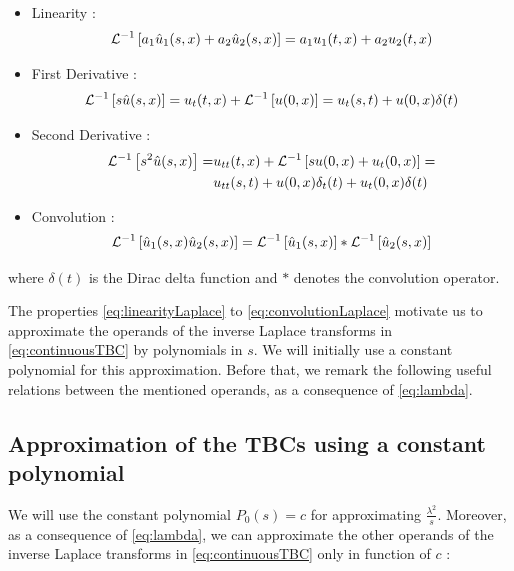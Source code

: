 \begin{itemize}
	\item Linearity :
		\begin{equation}
			\label{eq:linearityLaplace}
				\mathcal{L}^{-1} \left[a_1\hat{u}_1(s,x) + a_2\hat{u}_2(s,x)\right] = a_1u_1(t,x) + a_2u_2(t,x)
		\end{equation}
	\item First Derivative : 
		\begin{equation}
			\label{eq:firstDerivativeLaplace}
			\mathcal{L}^{-1} \left[ s\hat{u}(s,x) \right] = u_t(t,x) + \mathcal{L}^{-1} \left[ u(0,x) \right] =  u_t(s,t) +  u(0,x) \delta (t)
		\end{equation}
	\item Second Derivative : 
		\begin{equation}
			\label{eq:secondDerivativeLaplace}
			\begin{aligned}
			\mathcal{L}^{-1} \left[ s^2\hat{u}(s,x) \right] = & u_{tt}(t,x) + \mathcal{L}^{-1} \left[ su(0,x) + u_{t}(0,x)\right] = \\
																		   & u_{tt}(s,t) + u(0,x)\delta_t(t) +  u_t(0,x)\delta (t)
			\end{aligned}
		\end{equation}
	\item Convolution :
	\begin{equation}
		\label{eq:convolutionLaplace}
		\mathcal{L}^{-1} \left[ \hat{u}_1(s,x)\hat{u}_2(s,x)\right] = \mathcal{L}^{-1} \left[ \hat{u}_1(s,x)\right] * \mathcal{L}^{-1} \left[ \hat{u}_2(s,x)\right]
	\end{equation}
\end{itemize} 

\noindent where $\delta (t)$ is the Dirac delta function and $*$ denotes the convolution operator.

\indent The properties \eqref{eq:linearityLaplace} to \eqref{eq:convolutionLaplace} motivate us to approximate the operands of the inverse Laplace transforms in \eqref{eq:continuousTBC} by polynomials in $s$. We will initially use a constant polynomial for this approximation. Before that, we remark the following useful relations between the mentioned operands, as a consequence of \eqref{eq:lambda}.

\subsection{Approximation of the TBCs using a constant polynomial}

\indent We will use the constant polynomial $P_0(s) = c$ for approximating $\frac{\lambda^2}{s}$. Moreover, as a consequence of \eqref{eq:lambda}, we can approximate the other operands of the inverse Laplace transforms in \eqref{eq:continuousTBC} only in function of $c$ :

